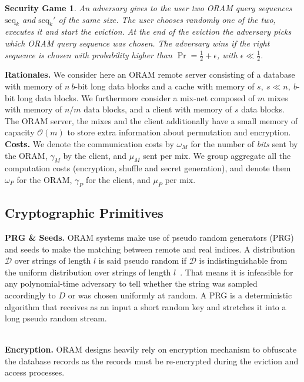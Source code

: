 \documentclass[USenglish,oneside,twocolumn]{article}
\newtheorem*{secgme}{Security Game}
\begin{document}
%
\begin{secgme}
An adversary gives to the user two ORAM query sequences $\text{seq}_k$ and $\text{seq}_k'$ of the same size. The user chooses randomly one of the two, executes it and start the eviction. At the end of the eviction the adversary picks which ORAM query sequence was chosen. The adversary wins if the right sequence is chosen with probability higher than $\Pr = \frac{1}{2}+\epsilon$, with $\epsilon\ll\frac{1}{2}$.
\label{def:Game}
\end{secgme} 
%

\noindent\textbf{Rationales.} We consider here an ORAM remote server consisting of a database with memory of $n\ b$-bit long data blocks and a cache with memory of $s,\ s\ll n,\ b$-bit long data blocks. We furthermore consider a mix-net composed of $m$ mixes with memory of $n/m$ data blocks, and a client with memory of $s$ data blocks. The ORAM server, the mixes and the client additionally have a small memory of capacity $\mathcal{O}(m)$ to store extra information about permutation and encryption.\\

\noindent\textbf{Costs.} We denote the communication costs by $\omega_M$ for the number of \emph{bits} sent by the ORAM, $\gamma_M$ by the client, and $\mu_M$ sent per mix. 
We group aggregate all the computation costs (encryption, shuffle and secret generation), and denote them $\omega_P$ for the ORAM, $\gamma_P$ for the client, and $\mu_P$ per mix. 
%
\subsection{Cryptographic Primitives}

\noindent\textbf{PRG \& Seeds.}
ORAM systems make use of pseudo random generators (PRG) and seeds to make the matching between remote and real indices. A distribution $\mathcal{D}$ over strings of length $l$ is said pseudo random if $\mathcal{D}$ is indistinguishable from the uniform distribution over strings of length $l$~\cite{katz2014introduction}. That means it is infeasible for any polynomial-time adversary to tell whether the string was sampled accordingly to $D$ or was chosen uniformly at random. A PRG is a deterministic algorithm that receives as an input a short random key and stretches it into a long pseudo random stream.\\\

\noindent\textbf{Encryption.}
ORAM designs heavily rely on encryption mechanism to obfuscate the database records as the records must be re-encrypted during the eviction and access processes.
\end{document}
